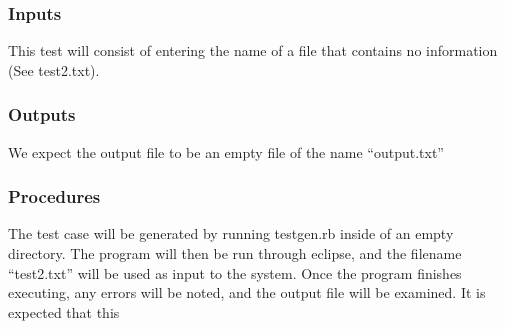 \documentclass[]{article}
\begin{document}
	\subsubsection{Inputs}
	This test will consist of entering the name of a file that contains no
	information (See test2.txt).
	
	\subsubsection{Outputs}
	We expect the output file to be an empty file of the name ``output.txt''
	
	\subsubsection{Procedures}
	The test case will be generated by running testgen.rb inside of an empty
	directory.  The program will then be run through eclipse, and the filename
	``test2.txt'' will be used as input to the system.  Once the program finishes
	executing, any errors will be noted, and the output file will be examined.  It
	is expected that this 
	

\end{document}
